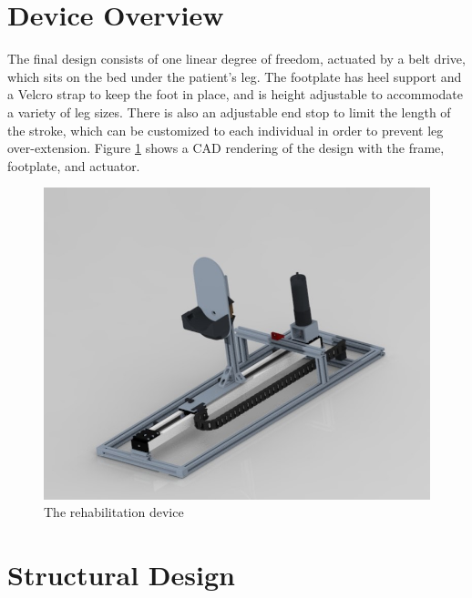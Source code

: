 \documentclass[12pt]{report}
\begin{document}
		
		
	
	

	\section{Device Overview}
	
	The final design consists of one linear degree of freedom, actuated by a belt drive, which sits on the bed under the patient's leg. The footplate has heel support and a Velcro strap to keep the foot in place, and is height adjustable to accommodate a variety of leg sizes. There is also an adjustable end stop to limit the length of the stroke, which can be customized to each individual in order to prevent leg over-extension. Figure \ref{fig:cad} shows a CAD rendering of the design with the frame, footplate, and actuator.

	\begin{figure}[h] 
		\centering
		\includegraphics[width=0.75\linewidth]{overall_device}
		\caption{The rehabilitation device}
		\label{fig:cad}
	\end{figure}
	
	
	\section{Structural Design}
	
\end{document}
